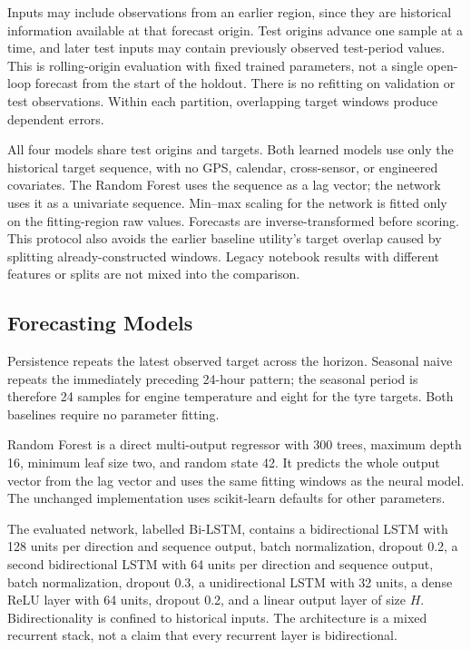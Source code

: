 \documentclass[conference]{IEEEtran}
\begin{document}
Inputs may include observations from an earlier region, since they are historical information available at that forecast origin. Test origins advance one sample at a time, and later test inputs may contain previously observed test-period values. This is rolling-origin evaluation with fixed trained parameters, not a single open-loop forecast from the start of the holdout. There is no refitting on validation or test observations. Within each partition, overlapping target windows produce dependent errors.

All four models share test origins and targets. Both learned models use only the historical target sequence, with no GPS, calendar, cross-sensor, or engineered covariates. The Random Forest uses the sequence as a lag vector; the network uses it as a univariate sequence. Min--max scaling for the network is fitted only on the fitting-region raw values. Forecasts are inverse-transformed before scoring. This protocol also avoids the earlier baseline utility's target overlap caused by splitting already-constructed windows. Legacy notebook results with different features or splits are not mixed into the comparison.

\subsection{Forecasting Models}
Persistence repeats the latest observed target across the horizon. Seasonal naive repeats the immediately preceding 24-hour pattern; the seasonal period is therefore 24 samples for engine temperature and eight for the tyre targets. Both baselines require no parameter fitting.

Random Forest is a direct multi-output regressor with 300 trees, maximum depth 16, minimum leaf size two, and random state 42. It predicts the whole output vector from the lag vector and uses the same fitting windows as the neural model. The unchanged implementation uses scikit-learn defaults for other parameters.

The evaluated network, labelled Bi-LSTM, contains a bidirectional LSTM with 128 units per direction and sequence output, batch normalization, dropout 0.2, a second bidirectional LSTM with 64 units per direction and sequence output, batch normalization, dropout 0.3, a unidirectional LSTM with 32 units, a dense ReLU layer with 64 units, dropout 0.2, and a linear output layer of size $H$. Bidirectionality is confined to historical inputs. The architecture is a mixed recurrent stack, not a claim that every recurrent layer is bidirectional.
\end{document}
